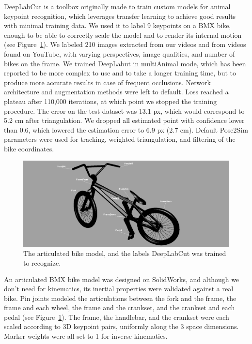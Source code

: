 DeepLabCut \cite{Mathis2018, Lauer2022} is a toolbox originally made to train custom models for animal keypoint recognition, which leverages transfer learning to achieve good results with minimal training data. We used it to label 9 keypoints on a BMX bike, enough to be able to correctly scale the model and to render its internal motion (see Figure~\ref{fig_bikemodel}). We labeled 210 images extracted from our videos and from videos found on YouTube, with varying perspectives, image qualities, and number of bikes on the frame. We trained DeepLabut in multiAnimal mode, which has been reported to be more complex to use and to take a longer training time, but to produce more accurate results in case of frequent occlusions. Network architecture and augmentation methods were left to default. Loss reached a plateau after 110,000 iterations, at which point we stopped the training procedure. The error on the test dataset was 13.1 px, which would correspond to 5.2 cm after triangulation. We dropped all estimated point with confidence lower than 0.6, which lowered the estimation error to 6.9 px (2.7 cm). Default Pose2Sim parameters were used for tracking, weighted triangulation, and filtering of the bike coordinates. 

\begin{figure}[hbtp]
	\centering
	\def\svgwidth{1\columnwidth}
	\fontsize{10pt}{10pt}\selectfont
	\includegraphics[width=\linewidth]{"../Chap7/Figures/Bike_keypoints.PNG"}
	\caption{The articulated bike model, and the labels DeepLabCut was trained to recognize.}
	\label{fig_bikemodel}
\end{figure}

An articulated BMX bike model was designed on SolidWorks, and although we don't need for kinematics, its inertial properties were validated against a real bike. Pin joints modeled the articulations between the fork and the frame, the frame and each wheel, the frame and the crankset, and the crankset and each pedal (see Figure~\ref{fig_bikemodel}). The frame, the handlebar, and the crankset were each scaled according to 3D keypoint pairs, uniformly along the 3 space dimensions. Marker weights were all set to 1 for inverse kinematics. 


